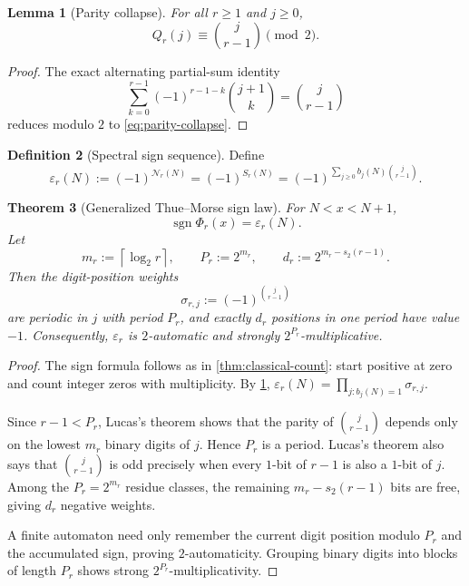 \documentclass[11pt,a4paper]{article}
\theoremstyle{frontier}
\newtheorem{theorem}{Theorem}[section]
\newtheorem{lemma}[theorem]{Lemma}
\theoremstyle{definition}
\newtheorem{definition}[theorem]{Definition}
\newcommand{\sgn}{\operatorname{sgn}}
\newcommand{\ceil}[1]{\left\lceil #1\right\rceil}
\begin{document}
\begin{lemma}[Parity collapse]\label{lem:parity-collapse}
For all $r\ge1$ and $j\ge0$,
\begin{equation}\label{eq:parity-collapse}
  Q_r(j)\equiv\binom j{r-1}\pmod2.
\end{equation}
\end{lemma}

\begin{proof}
The exact alternating partial-sum identity
\[
 \sum_{k=0}^{r-1}(-1)^{r-1-k}\binom{j+1}{k}=\binom j{r-1}
\]
reduces modulo $2$ to \eqref{eq:parity-collapse}.
\end{proof}

\begin{definition}[Spectral sign sequence]\label{def:eps-r}
Define
\begin{equation}\label{eq:eps-r}
 \varepsilon_r(N):=(-1)^{\mathcal N_r(N)}
 =(-1)^{S_r(N)}
 =(-1)^{\sum_{j\ge0}b_j(N)\binom j{r-1}}.
\end{equation}
\end{definition}

\begin{theorem}[Generalized Thue--Morse sign law]\label{thm:sign-law-r}
For $N<x<N+1$,
\begin{equation}\label{eq:sign-law-r}
  \sgn\Phi_r(x)=\varepsilon_r(N).
\end{equation}
Let
\begin{equation}\label{eq:Pr-dr}
 m_r:=\ceil{\log_2r},\qquad
 P_r:=2^{m_r},\qquad
 d_r:=2^{m_r-s_2(r-1)}.
\end{equation}
Then the digit-position weights
\begin{equation}\label{eq:sigma-rj}
 \sigma_{r,j}:=(-1)^{\binom j{r-1}}
\end{equation}
are periodic in $j$ with period $P_r$, and exactly $d_r$ positions in one period have value $-1$.  Consequently, $\varepsilon_r$ is $2$-automatic and strongly $2^{P_r}$-multiplicative.
\end{theorem}

\begin{proof}
The sign formula follows as in \cref{thm:classical-count}: start positive at zero and count integer zeros with multiplicity.  By \cref{lem:parity-collapse},
$\varepsilon_r(N)=\prod_{j:b_j(N)=1}\sigma_{r,j}$.

Since $r-1<P_r$, Lucas's theorem shows that the parity of $\binom j{r-1}$ depends only on the lowest $m_r$ binary digits of $j$.  Hence $P_r$ is a period.  Lucas's theorem also says that $\binom j{r-1}$ is odd precisely when every $1$-bit of $r-1$ is also a $1$-bit of $j$.  Among the $P_r=2^{m_r}$ residue classes, the remaining $m_r-s_2(r-1)$ bits are free, giving $d_r$ negative weights.

A finite automaton need only remember the current digit position modulo $P_r$ and the accumulated sign, proving $2$-automaticity.  Grouping binary digits into blocks of length $P_r$ shows strong $2^{P_r}$-multiplicativity.
\end{proof}
\end{document}
